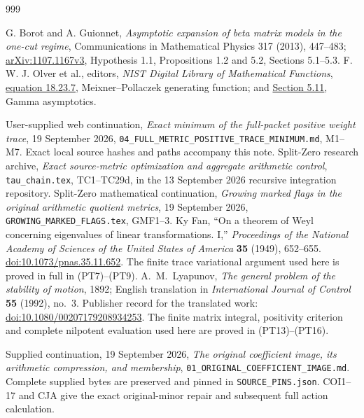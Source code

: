\documentclass[11pt,a4paper]{article}
\begin{document}
\clearpage
\begin{thebibliography}{999}

 G. Borot and A. Guionnet,
\emph{Asymptotic expansion of beta matrix models in the one-cut regime},
Communications in Mathematical Physics 317 (2013), 447--483;
\href{https://arxiv.org/abs/1107.1167}{arXiv:1107.1167v3},
Hypothesis 1.1, Propositions 1.2 and 5.2, Sections 5.1--5.3.
 F. W. J. Olver et al., editors,
\emph{NIST Digital Library of Mathematical Functions},
\href{https://dlmf.nist.gov/18.23.E7}{equation 18.23.7},
Meixner--Pollaczek generating function; and
\href{https://dlmf.nist.gov/5.11}{Section 5.11}, Gamma asymptotics.

User-supplied web continuation, \emph{Exact minimum of the full-packet
positive weight trace}, 19 September 2026,
\texttt{04\_FULL\_METRIC\_POSITIVE\_TRACE\_MINIMUM.md}, M1--M7.
Exact local source hashes and paths accompany this note.
Split-Zero research archive, \emph{Exact source-metric optimization and
aggregate arithmetic control}, \texttt{tau\_chain.tex}, TC1--TC29d,
in the 13 September 2026 recursive integration repository.
Split-Zero mathematical continuation, \emph{Growing marked flags in
the original arithmetic quotient metrics}, 19 September 2026,
\texttt{GROWING\_MARKED\_FLAGS.tex}, GMF1--3.
Ky Fan, ``On a theorem of Weyl concerning eigenvalues of linear
transformations. I,'' \emph{Proceedings of the National Academy of
Sciences of the United States of America} \textbf{35} (1949), 652--655.
\href{https://doi.org/10.1073/pnas.35.11.652}{doi:10.1073/pnas.35.11.652}.
The finite trace variational argument used here is proved in full
in (PT7)--(PT9).
A.~M.~Lyapunov, \emph{The general problem of the stability of motion},
1892; English translation in \emph{International Journal of Control}
\textbf{55} (1992), no.~3. Publisher record for the translated work:
\href{https://doi.org/10.1080/00207179208934253}{doi:10.1080/00207179208934253}.
The finite matrix integral, positivity criterion and complete
nilpotent evaluation used here are proved in (PT13)--(PT16).

Supplied continuation, 19 September 2026,
\emph{The original coefficient image, its arithmetic compression,
and membership}, \texttt{01\_ORIGINAL\_COEFFICIENT\_IMAGE.md}.
Complete supplied bytes are preserved and pinned in
\texttt{SOURCE\_PINS.json}. COI1--17 and CJA give the exact
original-minor repair and subsequent full action calculation.


\end{thebibliography}
\end{document}
